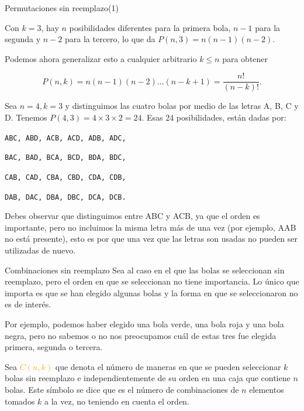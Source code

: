 \documentclass[10pt]{beamer}
\begin{document}
\begin{frame}{Permutaciones sin  reemplazo(1)}

\small{Con $k = 3$, hay $n$ posibilidades diferentes para la primera bola,  $n-1$ para la  segunda y $n-2$ para la  tercero, lo que da $P (n, 3) = n (n -1) (n -2 )$.
 
Podemos ahora generalizar esto a cualquier arbitrario $k \leq n $ para obtener
 
 \[
 P(n,k) = n(n - 1)(n - 2)\dots(n - k + 1) =\frac{n!}{(n - k)!}.
 \]
}

\small{

Sea $n = 4, k = 3$ y distinguimos las cuatro bolas por medio de las  letras A, B, C y  D. Tenemos $P(4,3) = 4 \times 3 \times 2 = 24$. Esas 24 posibilidades, est\'an dadas por:


\qquad \qquad \qquad \qquad \texttt{ABC, ABD, ACB, ACD, ADB, ADC,}

\qquad \qquad \qquad \qquad \texttt{BAC, BAD, BCA, BCD, BDA, BDC,}

\qquad \qquad \qquad \qquad \texttt{CAB, CAD, CBA, CBD, CDA, CDB,}

\qquad \qquad \qquad \qquad \texttt{DAB, DAC, DBA, DBC, DCA, DCB.}
}

\vspace{0.2cm}

\scriptsize{Debes observar  que distinguimos entre  ABC y ACB, ya que el orden es importante, pero no incluimos la misma letra m\'as de una vez (por ejemplo, AAB no est\'a presente), esto es por  que una vez  que las letras son usadas no pueden ser utilizadas de nuevo.}
\end{frame}

\begin{frame}{Combinaciones sin reemplazo}
Sea al caso en el que las bolas se seleccionan sin reemplazo, pero el orden en que se seleccionan no tiene importancia. Lo \'unico que importa es que se han elegido algunas bolas y la forma en  que se seleccionaron  no es de inter\'es.

Por ejemplo, podemos haber elegido una bola verde, una bola roja y una bola negra, pero  no sabemos o no nos preocupamos cu\'al de estas tres fue elegida primera, segunda o tercera. 

\vspace{0.2cm}

Sea  \textcolor{orange}{$C(n, k)$} que  denota  el n\'umero de maneras en que se pueden seleccionar $k$ bolas sin reemplazo e independientemente de su orden en  una caja que contiene $n$ bolas. Este s\'imbolo se dice que es el n\'umero de combinaciones de $n$ elementos tomados $k$ a la vez,  no teniendo en cuenta el orden.

\end{frame}
\end{document}
